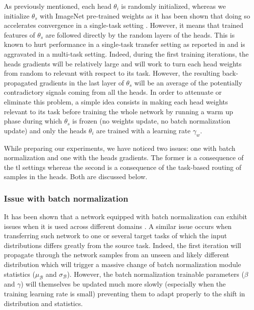 As previously mentioned, each head $\theta_i$ is randomly initialized, whereas we initialize $\theta_s$ with ImageNet pre-trained weights as it has been shown that doing so accelerates convergence in a single-task setting \cite{mormont2018comparison}. However, it means that trained features of $\theta_s$ are followed directly by the random layers of the heads. This is known to hurt performance in a single-task transfer setting as reported in \citeauthor{yosinski2014transferable} \cite{yosinski2014transferable} and is aggravated in a multi-task setting. Indeed, during the first training iterations, the heads gradients will be relatively large and will work to turn each head weights from random to relevant with respect to its task. However, the resulting back-propagated gradients in the last layer of $\theta_s$ will be an average of the potentially contradictory signals coming from all the heads. In order to attenuate or eliminate this problem, a simple idea consists in making each head weights relevant to its task before training the whole network by running a warm up phase during which $\theta_s$ is frozen (\ie no weights update, no batch normalization update) and only the heads $\theta_i$ are trained with a learning rate $\gamma_w$. 

While preparing our experiments, we have noticed two issues: one with batch normalization \cite{ioffe2015batch} and one with the heads gradients. The former is a consequence of the \acrlong{tl} settings whereas the second is a consequence of the task-based routing of samples in the heads. Both are discussed below.

\subsubsection{Issue with batch normalization} 
\label{sssec:mtask:batchnormissue}

It has been shown that a network equipped with batch normalization \cite{ioffe2015batch} can exhibit issues when it is used across different domains \cite{li2018adaptive, chang2019domain}. A similar issue occurs when transferring such network to one or several target tasks of which the input distributions differs greatly from the source task. Indeed, the first iteration will propagate through the network samples from an unseen and likely different distribution which will trigger a massive change of batch normalization module statistics ($\mu_\mathcal{B}$ and $\sigma_\mathcal{B}$). However, the batch normalization trainable parameters ($\beta$ and $\gamma$) will themselves be updated much more slowly (especially when the training learning rate is small) preventing them to adapt properly to the shift in distribution and statistics. 

